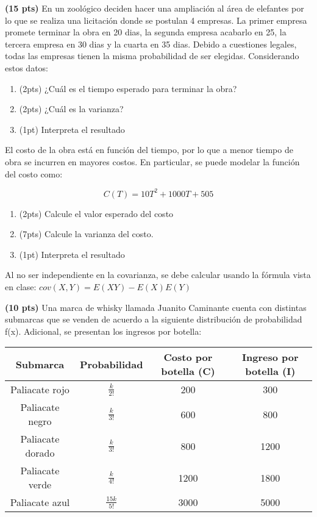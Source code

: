 \documentclass[addpoints]{exam}
\theoremstyle{mytheor}
\begin{document}
  \begin{questions}
  
\question \textbf{(15 pts)} En un zoológico deciden hacer una ampliación al área de elefantes por lo que se realiza una licitación donde se postulan 4 empresas. La primer empresa promete terminar la obra en 20 dias, la segunda empresa acabarlo en 25, la tercera empresa en 30 dias y la cuarta en 35 dias. Debido a cuestiones legales, todas las empresas tienen la misma probabilidad de ser elegidas. Considerando estos datos:

\begin{enumerate}[label=\Alph*)]
\item (2pts) ¿Cuál es el tiempo esperado para terminar la obra?
\item (2pts) ¿Cuál es la varianza? 
\item (1pt) Interpreta el resultado
\end{enumerate}

El costo de la obra está en función del tiempo, por lo que a menor tiempo de obra se incurren en mayores costos. En particular, se puede modelar la función del costo como:


$$C(T) = 10T^2+1000T+505$$


\begin{enumerate}[label=\Alph*)]
\item (2pts) Calcule el valor esperado del costo
\item (7pts) Calcule la varianza del costo. 
\item (1pt) Interpreta el resultado
\end{enumerate}

Al no ser independiente en la covarianza, se debe calcular usando la fórmula vista en clase: $cov(X,Y) = E(XY) - E(X)E(Y)$

\question \textbf{(10 pts)}
Una marca de whisky llamada Juanito Caminante cuenta con distintas submarcas que se venden de acuerdo a la siguiente distribución de probabilidad f(x). Adicional, se presentan los ingresos por botella:

\begin{center}
\begin{tabular}{ |c|c|c|c| } 
\hline
Submarca & Probabilidad & Costo por botella (C) & Ingreso por botella (I)\\
 \hline
 Paliacate rojo & $\frac{k}{2!}$ & 200 & 300 \\ 
 Paliacate negro & $\frac{k}{3!}$ & 600 & 800 \\ 
 Paliacate dorado & $\frac{k}{3!}$ & 800 & 1200 \\ 
 Paliacate verde & $\frac{k}{4!}$ & 1200 & 1800 \\
 Paliacate azul & $\frac{15k}{5!}$ & 3000 & 5000 \\ 
 \hline
\end{tabular}
\end{center}



\end{questions}
\end{document}
